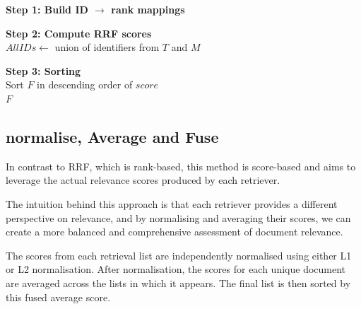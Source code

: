 \documentclass[12pt,twoside]{report}
\begin{document}
\begin{algorithm}[t!h]
\caption{Reciprocal Rank Fusion (RRF) Across Modalities}
\label{alg:rrf}

\BlankLine
\textbf{Step 1: Build ID $\rightarrow$ rank mappings} \\

\BlankLine
\textbf{Step 2: Compute RRF scores} \\
$AllIDs \leftarrow$ union of identifiers from $T$ and $M$ \\

\BlankLine
\textbf{Step 3: Sorting} \\
Sort $F$ in descending order of $score$ \\

\Return $F$
\end{algorithm}

\subsection{normalise, Average and Fuse}

In contrast to RRF, which is rank-based, this method is score-based and aims to leverage the actual relevance scores produced by each retriever.

The intuition behind this approach is that each retriever provides a different perspective on relevance, and by normalising and averaging their scores, we can create a more balanced and comprehensive assessment of document relevance.

The scores from each retrieval list are independently normalised using either L1 or L2 normalisation. After normalisation, the scores for each unique document are averaged across the lists in which it appears. The final list is then sorted by this fused average score.
\end{document}
